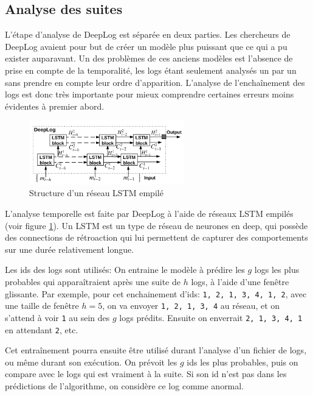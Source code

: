 \documentclass[openany, 11pt]{memoir}
\begin{document}
\subsection{Analyse des suites}

L'étape d'analyse de DeepLog est séparée en deux parties. Les chercheurs de DeepLog avaient pour but de créer un modèle plus puissant que ce qui a pu exister auparavant. Un des problèmes de ces anciens modèles est l'absence de prise en compte de la temporalité, les \glspl{log} étant seulement analysés un par un sans prendre en compte leur ordre d'apparition. L'analyse de l'enchaînement des logs est donc très importante pour mieux comprendre certaines erreurs moins évidentes à premier abord.

\begin{figure}[ht]
	\centering
	\includegraphics[width=0.6\textwidth]{images/stacked_lstm.png}
	\caption{Structure d'un réseau LSTM empilé}
	\label{lstm}
\end{figure}

L'analyse temporelle est faite par DeepLog à l'aide de réseaux \gls{LSTM} empilés (voir figure \ref{lstm}). Un \gls{LSTM} est un type de réseau de neurones en \gls{deep}, qui possède des connections de rétroaction qui lui permettent de capturer des comportements sur une durée relativement longue.

Les ids des \glspl{log} sont utilisés: On entraine le modèle à prédire les $g$ logs les plus probables qui apparaîtraient après une suite de $h$ logs, à l'aide d'une fenêtre glissante. Par exemple, pour cet enchainement d'ids: \texttt{1, 2, 1, 3, 4, 1, 2}, avec une taille de fenêtre $h=5$, on va envoyer \texttt{1, 2, 1, 3, 4} au réseau, et on s'attend à voir \texttt{1} au sein des $g$ logs prédits. Ensuite on enverrait \texttt{2, 1, 3, 4, 1} en attendant \texttt{2}, etc.

\bigskip
Cet entraînement pourra ensuite être utilisé durant l'analyse d'un fichier de \glspl{log}, ou même durant son exécution. On prévoit les $g$ ids les plus probables, puis on compare avec le logs qui est vraiment à la suite. Si son id n'est pas dans les prédictions de l'algorithme, on considère ce log comme anormal.
\end{document}
